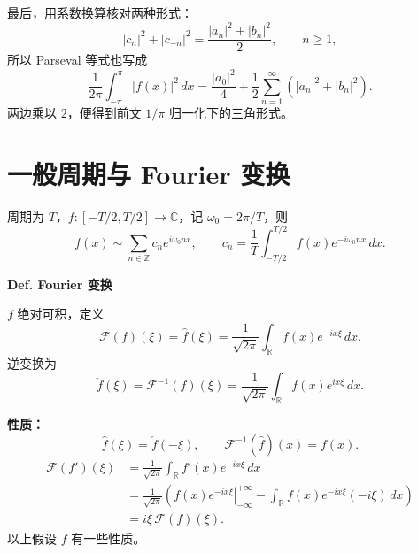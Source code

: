 \documentclass[11pt,a4paper]{ctexart}
\begin{document}
最后，用系数换算核对两种形式：
\[
 |c_n|^2+|c_{-n}|^2=\frac{|a_n|^2+|b_n|^2}{2},\qquad n\geq1,
\]
所以 Parseval 等式也写成
\[
 \frac{1}{2\pi}\int_{-\pi}^{\pi}|f(x)|^2\,dx
 =\frac{|a_0|^2}{4}
 +\frac12\sum_{n=1}^{\infty}(|a_n|^2+|b_n|^2).
\]
两边乘以 $2$，便得到前文 $1/\pi$ 归一化下的三角形式。

\section*{一般周期与 Fourier 变换}

周期为 $T$，$f:[-T/2,T/2]\to\mathbb C$，记 $\omega_0=2\pi/T$，则
\[
 f(x)\sim\sum_{n\in\mathbb Z}c_ne^{i\omega_0nx},\qquad
 c_n=\frac{1}{T}\int_{-T/2}^{T/2}f(x)e^{-i\omega_0nx}\,dx.
\]

\noindent\textbf{Def. Fourier 变换}

$f$ 绝对可积，定义
\[
 \mathcal F(f)(\xi)=\widehat f(\xi)
 =\frac{1}{\sqrt{2\pi}}\int_{\mathbb R}f(x)e^{-ix\xi}\,dx.
\]
逆变换为
\[
 \check f(\xi)=\mathcal F^{-1}(f)(\xi)
 =\frac{1}{\sqrt{2\pi}}\int_{\mathbb R}f(x)e^{ix\xi}\,dx.
\]

\noindent\textbf{性质：}
\[
 \widehat f(\xi)=\check f(-\xi),\qquad
 \mathcal F^{-1}(\widehat f)(x)=f(x).
\]
\begin{align*}
 \mathcal F(f')(\xi)
 &=\frac{1}{\sqrt{2\pi}}\int_{\mathbb R}f'(x)e^{-ix\xi}\,dx\\
 &=\frac{1}{\sqrt{2\pi}}\left(
 \left.f(x)e^{-ix\xi}\right|_{-\infty}^{+\infty}
 -\int_{\mathbb R}f(x)e^{-ix\xi}(-i\xi)\,dx\right)\\
 &=i\xi\,\mathcal F(f)(\xi).
\end{align*}
以上假设 $f$ 有一些性质。
\end{document}
